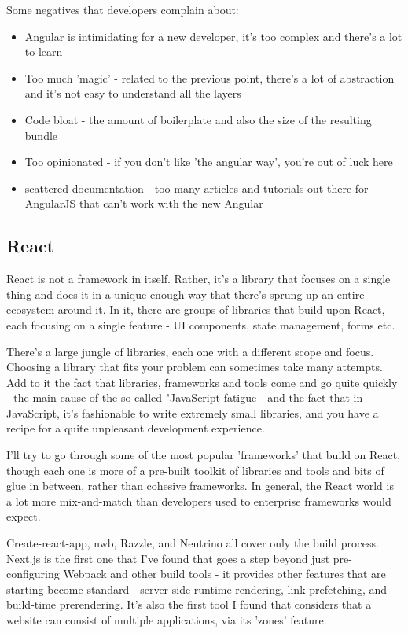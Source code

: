 \documentclass[english,odsaz]{fitthesis}
\begin{document}
Some negatives that developers complain about:
\begin{itemize}
\item Angular is intimidating for a new developer, it's too complex and there's a
lot to learn
\item Too much 'magic' - related to the previous point, there's a lot of abstraction
and it's not easy to understand all the layers
\item Code bloat - the amount of boilerplate and also the size of the resulting bundle
\item Too opinionated - if you don't like 'the angular way', you're out of luck here
\item scattered documentation - too many articles and tutorials out there for
AngularJS that can't work with the new Angular
\end{itemize}

\subsection{React}
\label{sec:org5c410c4}
React is not a framework in itself. Rather, it's a library that focuses on a
single thing and does it in a unique enough way that there's sprung up an entire
ecosystem around it. In it, there are groups of libraries that build upon React,
each focusing on a single feature - UI components, state management, forms etc.

There's a large jungle of libraries, each one with a different scope and
focus. Choosing a library that fits your problem can sometimes take many
attempts. Add to it the fact that libraries, frameworks and tools come and go
quite quickly - the main cause of the so-called "JavaScript fatigue - and the
fact that in JavaScript, it's fashionable to write extremely small libraries,
and you have a recipe for a quite unpleasant development experience.

I'll try to go through some of the most popular 'frameworks' that build on
React, though each one is more of a pre-built toolkit of libraries and tools
and bits of glue in between, rather than cohesive frameworks. In general, the
React world is a lot more mix-and-match than developers used to enterprise
frameworks would expect.

Create-react-app, nwb, Razzle, and Neutrino all cover only the build
process. Next.js is the first one that I've found that goes a step beyond just
pre-configuring Webpack and other build tools - it provides other features that
are starting become standard - server-side runtime rendering, link prefetching,
and build-time prerendering. It's also the first tool I found that considers
that a website can consist of multiple applications, via its 'zones' feature.
\end{document}
